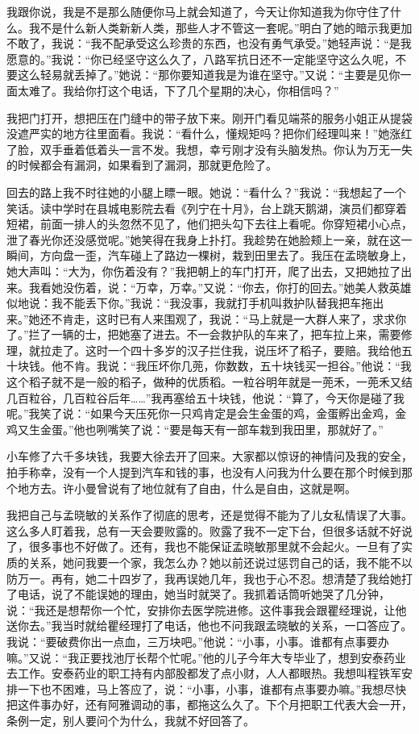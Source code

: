 \documentclass[12pt,oneside]{book}
\begin{document}
我跟你说，我是不是那么随便你马上就会知道了，今天让你知道我为你守住了什么。我不是什么新人类新新人类，那些人才不管这一套呢。''明白了她的暗示我更加不敢了，我说：``我不配承受这么珍贵的东西，也没有勇气承受。''她轻声说：``是我愿意的。''我说：``你已经坚守这么久了，八路军抗日还不一定能坚守这么久呢，不要这么轻易就丢掉了。''她说：``那你要知道我是为谁在坚守。''又说：``主要是见你一面太难了。我给你打这个电话，下了几个星期的决心，你相信吗？''

我把门打开，想把压在门缝中的带子放下来。刚开门看见端茶的服务小姐正从提袋没遮严实的地方往里面看。我说：``看什么，懂规矩吗？把你们经理叫来！''她涨红了脸，双手垂着低着头一言不发。我想，幸亏刚才没有头脑发热。你认为万无一失的时候都会有漏洞，如果看到了漏洞，那就更危险了。

回去的路上我不时往她的小腿上瞟一眼。她说：``看什么？''我说：``我想起了一个笑话。读中学时在县城电影院去看《列宁在十月》，台上跳天鹅湖，演员们都穿着短裙，前面一排人的头忽然不见了，他们把头勾下去往上看呢。你穿短裙小心点，泄了春光你还没感觉呢。''她笑得在我身上扑打。我趁势在她脸颊上一亲，就在这一瞬间，方向盘一歪，汽车碰上了路边一棵树，栽到田里去了。我压在孟晓敏身上，她大声叫：``大为，你伤着没有？''我把朝上的车门打开，爬了出去，又把她拉了出来。我看她没伤着，说：``万幸，万幸。''又说：``你去，你打的回去。''她美人救英雄似地说：我不能丢下你。''我说：``我没事，我就打手机叫救护队替我把车拖出来。''她还不肯走，这时已有人来围观了，我说：``马上就是一大群人来了，求求你了。''拦了一辆的士，把她塞了进去。不一会救护队的车来了，把车拉上来，需要修理，就拉走了。这时一个四十多岁的汉子拦住我，说压坏了稻子，要赔。我给他五十块钱。他不肯。我说：``我压坏你几蔸，你数数，五十块钱买一担谷。''他说：``我这个稻子就不是一般的稻子，做种的优质稻。一粒谷明年就是一蔸禾，一蔸禾又结几百粒谷，几百粒谷后年\ldots\ldots{}''我再塞给五十块钱，他说：``算了，今天你是碰了我呢。''我笑了说：``如果今天压死你一只鸡肯定是会生金蛋的鸡，金蛋孵出金鸡，金鸡又生金蛋。''他也咧嘴笑了说：``要是每天有一部车栽到我田里，那就好了。''

小车修了六千多块钱，我要大徐去开了回来。大家都以惊讶的神情问及我的安全，拍手称幸，没有一个人提到汽车和钱的事，也没有人问我为什么要在那个时候到那个地方去。许小曼曾说有了地位就有了自由，什么是自由，这就是啊。

我把自己与孟晓敏的关系作了彻底的思考，还是觉得不能为了儿女私情误了大事。这么多人盯着我，总有一天会要败露的。败露了我不一定下台，但很多话就不好说了，很多事也不好做了。还有，我也不能保证孟晓敏那里就不会起火。一旦有了实质的关系，她问我要一个家，我怎么办？她以前还说过惩罚自己的话，我不能不以防万一。再有，她二十四岁了，我再误她几年，我也于心不忍。想清楚了我给她打了电话，说了不能误她的理由，她当时就哭了。我抓着话筒听她哭了几分钟，说：``我还是想帮你一个忙，安排你去医学院进修。这件事我会跟瞿经理说，让他送你去。''我当时就给瞿经理打了电话，他也不问我跟孟晓敏的关系，一口答应了。我说：``要破费你出一点血，三万块吧。''他说：``小事，小事。谁都有点事要办嘛。''又说：``我正要找池厅长帮个忙呢。''他的儿子今年大专毕业了，想到安泰药业去工作。安泰药业的职工持有内部股都发了点小财，人人都眼热。我想叫程铁军安排一下也不困难，马上答应了，说：``小事，小事，谁都有点事要办嘛。''我想尽快把这件事办好，还有阿雅调动的事，都拖这么久了。下个月把职工代表大会一开，条例一定，别人要问个为什么，我就不好回答了。
\end{document}
